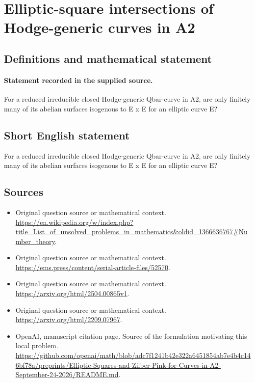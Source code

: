 \documentclass[11pt]{article}
\begin{document}
\section*{Elliptic-square intersections of Hodge-generic curves in A2}\label{30007251}
\subsection{Definitions and mathematical statement}
\paragraph{Statement recorded in the supplied source.}
For a reduced irreducible closed Hodge-generic Qbar-curve in A2, are only finitely many of its abelian surfaces isogenous to E x E for an elliptic curve E?
\subsection{Short English statement}
For a reduced irreducible closed Hodge-generic Qbar-curve in A2, are only finitely many of its abelian surfaces isogenous to E x E for an elliptic curve E?
\subsection{Sources}
\begin{itemize}
\item[S1] Original question source or mathematical context.
\url{https://en.wikipedia.org/w/index.php?title=List_of_unsolved_problems_in_mathematics&oldid=1366636767#Number_theory}.
\item[S2] Original question source or mathematical context.
\url{https://ems.press/content/serial-article-files/52570}.
\item[S3] Original question source or mathematical context.
\url{https://arxiv.org/html/2504.00865v1}.
\item[S4] Original question source or mathematical context.
\url{https://arxiv.org/html/2209.07967}.
\item[S5] OpenAI, manuscript citation page. Source of the formulation motivating this local problem.
\url{https://github.com/openai/math/blob/adc7f1241b42e322a6451854ab7e4b4c146bf78a/preprints/Elliptic-Squares-and-Zilber-Pink-for-Curves-in-A2-September-24-2026/README.md}.
\end{itemize}
\end{document}
